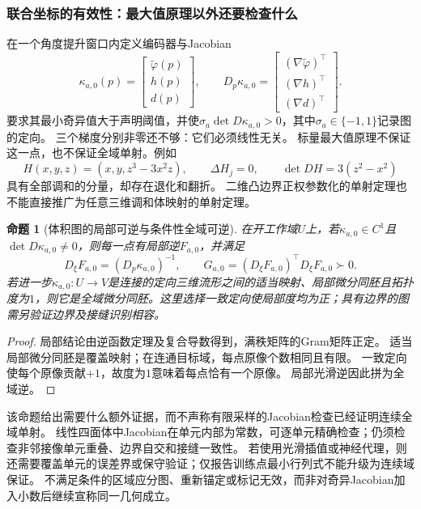 \documentclass[11pt,a4paper]{article}
\numberwithin{equation}{section}
\newtheorem{proposition}[theorem]{命题}
\theoremstyle{definition}
\begin{document}
\subsubsection{联合坐标的有效性：最大值原理以外还要检查什么}
在一个角度提升窗口内定义编码器与Jacobian
\begin{equation}
 \kappa_{a,0}(p)=\begin{bmatrix}\widetilde\varphi(p)\\h(p)\\d(p)\end{bmatrix},
 \qquad
 D_p\kappa_{a,0}=
 \begin{bmatrix}(\nabla\widetilde\varphi)^{\top}\\
                 (\nabla h)^{\top}\\(\nabla d)^{\top}\end{bmatrix}.
 \label{geo:eq:coordinate-jacobian}
\end{equation}
要求其最小奇异值大于声明阈值，并使$\sigma_a\det D\kappa_{a,0}>0$，其中$\sigma_a\in\{-1,1\}$记录图的定向。
三个梯度分别非零还不够：它们必须线性无关。
标量最大值原理不保证这一点，也不保证全域单射。例如
\begin{equation}
 H(x,y,z)=(x,y,z^3-3x^2z),\qquad
 \Delta H_j=0,\qquad\det DH=3(z^2-x^2)
 \label{geo:eq:harmonic-counterexample}
\end{equation}
具有全部调和的分量，却存在退化和翻折。
二维凸边界正权参数化的单射定理\cite{geoFloater2003}也不能直接推广为任意三维调和体映射的单射定理。

\begin{proposition}[体积图的局部可逆与条件性全域可逆]
\label{geo:prop:volume-inverse}
在开工作域$U$上，若$\kappa_{a,0}\in C^1$且$\det D\kappa_{a,0}\ne0$，则每一点有局部逆$F_{a,0}$，并满足
\begin{equation}
 D_\xi F_{a,0}=(D_p\kappa_{a,0})^{-1},\qquad
 G_{a,0}=(D_\xi F_{a,0})^{\top}D_\xi F_{a,0}\succ0.
 \label{geo:eq:volume-inverse-metric}
\end{equation}
若进一步$\kappa_{a,0}:U\to V$是连接的定向三维流形之间的适当映射、局部微分同胚且拓扑度为$1$，则它是全域微分同胚。这里选择一致定向使局部度均为正；具有边界的图需另验证边界及接缝识别相容。
\end{proposition}
\begin{proof}
局部结论由逆函数定理及复合导数得到，满秩矩阵的Gram矩阵正定。
适当局部微分同胚是覆盖映射；在连通目标域，每点原像个数相同且有限。
一致定向使每个原像贡献$+1$，故度为$1$意味着每点恰有一个原像。
局部光滑逆因此拼为全域逆。
\end{proof}
该命题给出需要什么额外证据，而不声称有限采样的Jacobian检查已经证明连续全域单射。
线性四面体中Jacobian在单元内部为常数，可逐单元精确检查；仍须检查非邻接像单元重叠、边界自交和接缝一致性。
若使用光滑插值或神经代理，则还需要覆盖单元的误差界或保守验证；仅报告训练点最小行列式不能升级为连续域保证。
不满足条件的区域应分图、重新锚定或标记无效，而非对奇异Jacobian加入小数后继续宣称同一几何成立。
\end{document}
